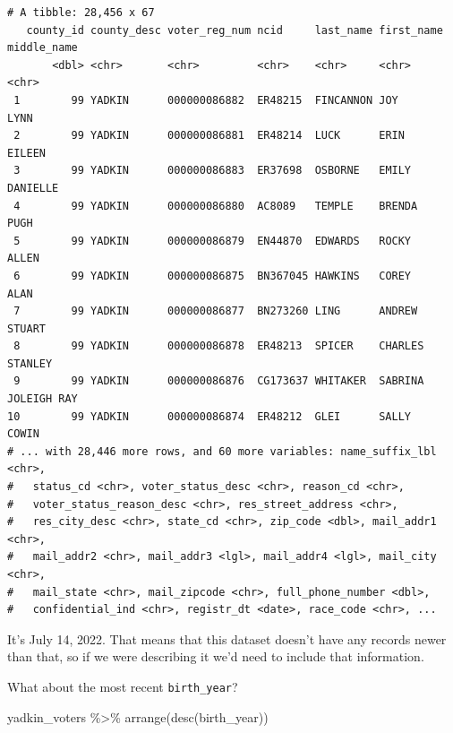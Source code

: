 \documentclass[
  letterpaper,
  DIV=11,
  numbers=noendperiod]{scrreprt}
\newenvironment{Shaded}{\begin{snugshade}}{\end{snugshade}}
\newcommand{\FunctionTok}[1]{\textcolor[rgb]{0.28,0.35,0.67}{#1}}
\newcommand{\NormalTok}[1]{\textcolor[rgb]{0.00,0.23,0.31}{#1}}
\newcommand{\SpecialCharTok}[1]{\textcolor[rgb]{0.37,0.37,0.37}{#1}}
\begin{document}
\begin{verbatim}
# A tibble: 28,456 x 67
   county_id county_desc voter_reg_num ncid     last_name first_name middle_name
       <dbl> <chr>       <chr>         <chr>    <chr>     <chr>      <chr>      
 1        99 YADKIN      000000086882  ER48215  FINCANNON JOY        LYNN       
 2        99 YADKIN      000000086881  ER48214  LUCK      ERIN       EILEEN     
 3        99 YADKIN      000000086883  ER37698  OSBORNE   EMILY      DANIELLE   
 4        99 YADKIN      000000086880  AC8089   TEMPLE    BRENDA     PUGH       
 5        99 YADKIN      000000086879  EN44870  EDWARDS   ROCKY      ALLEN      
 6        99 YADKIN      000000086875  BN367045 HAWKINS   COREY      ALAN       
 7        99 YADKIN      000000086877  BN273260 LING      ANDREW     STUART     
 8        99 YADKIN      000000086878  ER48213  SPICER    CHARLES    STANLEY    
 9        99 YADKIN      000000086876  CG173637 WHITAKER  SABRINA    JOLEIGH RAY
10        99 YADKIN      000000086874  ER48212  GLEI      SALLY      COWIN      
# ... with 28,446 more rows, and 60 more variables: name_suffix_lbl <chr>,
#   status_cd <chr>, voter_status_desc <chr>, reason_cd <chr>,
#   voter_status_reason_desc <chr>, res_street_address <chr>,
#   res_city_desc <chr>, state_cd <chr>, zip_code <dbl>, mail_addr1 <chr>,
#   mail_addr2 <chr>, mail_addr3 <lgl>, mail_addr4 <lgl>, mail_city <chr>,
#   mail_state <chr>, mail_zipcode <chr>, full_phone_number <dbl>,
#   confidential_ind <chr>, registr_dt <date>, race_code <chr>, ...
\end{verbatim}

It's July 14, 2022. That means that this dataset doesn't have any
records newer than that, so if we were describing it we'd need to
include that information.

What about the most recent \texttt{birth\_year}?

\begin{Shaded}
\begin{Highlighting}[]
\NormalTok{yadkin\_voters }\SpecialCharTok{\%\textgreater{}\%} \FunctionTok{arrange}\NormalTok{(}\FunctionTok{desc}\NormalTok{(birth\_year))}
\end{Highlighting}
\end{Shaded}
\end{document}
